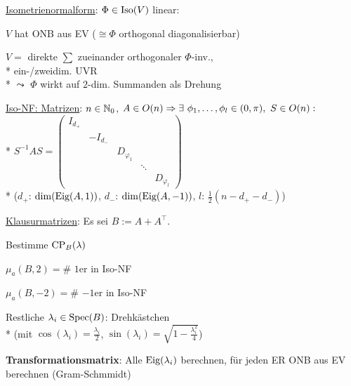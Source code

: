 \begin{items}
	\item \underline{Isometrienormalform}: \( \Phi \in \text{Iso}(V) \) linear:
		\begin{enumeration}
			\item \( V \) hat ONB aus EV (\( \cong \Phi \) orthogonal diagonalisierbar)
			\item \( V =  \) direkte \( \sum \) zueinander orthogonaler \( \Phi \)-inv., \\* ein-/zweidim. UVR
				\\*
				\( \leadsto \) \( \Phi \) wirkt auf \( 2 \)-dim. Summanden als Drehung
		\end{enumeration}

	\newpage

	\item \underline{Iso-NF: Matrizen}: \( n \in \mathbb{N}_0 \), \( A \in O(n) \\* \Rightarrow \exists \ \phi_1, \dots, \phi_l \in (0,\pi), \ S \in O(n): \)
		\\*
		\( S^{-1}AS = \left( \begin{smallmatrix}
			I_{d_+} & & & &  \\
			 & -I_{d_-} & & &  \\
			 & & D_{\varphi_1} & &  \\
			 & & & \ddots &  \\
			 & & & & D_{\varphi_l}
		\end{smallmatrix} \right) \)
		\\*
		(\( d_+ \): \( \dim(\text{Eig}(A,1)) \), \( d_- \): \( \dim(\text{Eig}(A,-1)) \), \( l \): \( \tfrac{1}{2}(n-d_+-d_-) \))
	\item \underline{Klausurmatrizen}: Es sei \( B := A + A^\top  \).
		\begin{enumeration}
			\item Bestimme \( \text{CP}_B(\lambda) \)
			\item \( \mu_a(B,2) = \# \) \( 1 \)er in Iso-NF
			\item \( \mu_a(B,-2) = \# \) \( -1 \)er in Iso-NF
			\item Restliche \( \lambda_i \in \text{Spec}(B) \): Drehkästchen \\* (mit \( \cos(\lambda_i) = \tfrac{\lambda_i}{2} \), \( \sin(\lambda_i) = \sqrt{1-\tfrac{\lambda_i^2}{4}} \))
			\item \textbf{Transformationsmatrix}: Alle \( \text{Eig}(\lambda_i) \) berechnen, für jeden ER ONB aus EV berechnen (Gram-Schmmidt)
		\end{enumeration}
\end{items}

